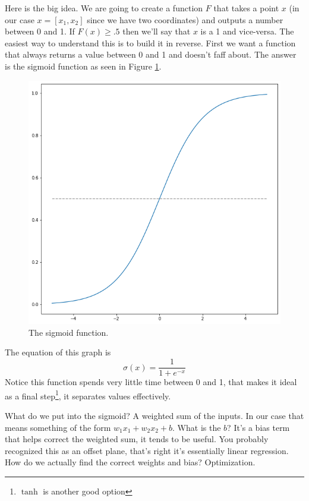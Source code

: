 \documentclass[11pt,letterpaper]{article}
\begin{document}
Here is the big idea. We are going to create a function $F$ that takes a point $x$ (in our case $x=[x_1,x_2]$ since we have two coordinates) and outputs a number between 0 and 1. If $F(x)\ge .5$ then we'll say that $x$ is a 1 and vice-versa. The easiest way to understand this is to build it in reverse. First we want a function that always returns a value between 0 and 1 and doesn't faff about. 
The answer is the sigmoid function as seen in Figure \ref{fig:sigmoid_graph}.
\begin{figure}[!h]
 \centering
 \includegraphics[width=.4\textwidth]{images/sigmoid_graph.png}
 \caption{The sigmoid function.}
 \label{fig:sigmoid_graph}
\end{figure}
The equation of this graph is 
\begin{equation}
\label{eqn:sigmoid}
\sigma(x) = \frac{1}{1+e^{-x}}
\end{equation}
Notice this function spends very little time between 0 and 1, that makes it ideal as a final step\footnote{$\tanh$ is another good option}, it separates values effectively. 

What do we put into the sigmoid? A weighted sum of the inputs. In our case that means something of the form $w_1x_1+w_2x_2 + b$. What is the $b$? It's a bias term that helps correct the weighted sum, it tends to be useful. You probably recognized this as an offset plane, that's right it's essentially linear regression. How do we actually find the correct weights and bias? Optimization. 
\end{document}
